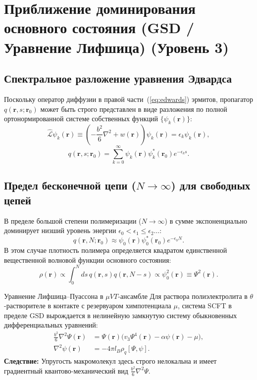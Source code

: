 \documentclass[12pt,a4paper]{article}
\begin{document}
\section{Приближение доминирования основного состояния (GSD / Уравнение Лифшица) (Уровень 3)}

\subsection{Спектральное разложение уравнения Эдвардса}
Поскольку оператор диффузии в правой части~(\ref{eq:edwards}) эрмитов, пропагатор $q(\mathbf{r}, s; \mathbf{r}_0)$ может быть строго представлен в виде разложения по полной ортонормированной системе собственных функций $\{\psi_k(\mathbf{r})\}$:
\begin{equation}
\hat{\mathcal{L}}\psi_k(\mathbf{r}) \equiv \left( -\frac{b^2}{6}\nabla^2 + w(\mathbf{r}) \right) \psi_k(\mathbf{r}) = \epsilon_k \psi_k(\mathbf{r}),
\end{equation}
\begin{equation}
q(\mathbf{r}, s; \mathbf{r}_0) = \sum_{k=0}^\infty \psi_k(\mathbf{r})\psi_k^*(\mathbf{r}_0) e^{-\epsilon_k s}.
\end{equation}

\subsection{Предел бесконечной цепи ($N \to \infty$) для свободных цепей}
В пределе большой степени полимеризации ($N \to \infty$) в сумме экспоненциально доминирует низший уровень энергии $\epsilon_0 < \epsilon_1 \le \epsilon_2 \dots$:
\begin{equation}
q(\mathbf{r}, N; \mathbf{r}_0) \approx \psi_0(\mathbf{r})\psi_0^*(\mathbf{r}_0) e^{-\epsilon_0 N}.
\end{equation}
В этом случае плотность полимера определяется квадратом единственной вещественной волновой функции основного состояния:
\begin{equation}
\rho(\mathbf{r}) \propto \int_0^N ds \, q(\mathbf{r}, s) q(\mathbf{r}, N-s) \propto \psi_0^2(\mathbf{r}) \equiv \Psi^2(\mathbf{r}).
\end{equation}

\begin{theorybox}{Уравнение Лифшица--Пуассона в $\mu VT$-ансамбле}
Для раствора полиэлектролита в $\theta$-растворителе в контакте с резервуаром химпотенциала $\mu$, система SCFT в пределе GSD вырождается в нелинейную замкнутую систему обыкновенных дифференциальных уравнений:
\begin{align}
\frac{b^2}{6}\nabla^2 \Psi(\mathbf{r}) &= \Psi(\mathbf{r}) \Big( v_3 \Psi^4(\mathbf{r}) - \alpha \psi(\mathbf{r}) - \mu \Big), \label{eq:lifshitz} \\
\nabla^2 \psi(\mathbf{r}) &= -4\pi l_B \rho_q[\Psi, \psi]. \label{eq:poisson}
\end{align}
\textbf{Следствие:} Упругость макромолекул здесь строго нелокальна и имеет градиентный квантово-механический вид $\frac{b^2}{6}\nabla^2 \Psi$.
\end{theorybox}
\end{document}
